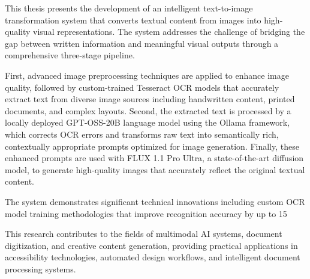 
This thesis presents the development of an intelligent text-to-image transformation system that converts textual content from images into high-quality visual representations. The system addresses the challenge of bridging the gap between written information and meaningful visual outputs through a comprehensive three-stage pipeline.

First, advanced image preprocessing techniques are applied to enhance image quality, followed by custom-trained Tesseract OCR models that accurately extract text from diverse image sources including handwritten content, printed documents, and complex layouts. Second, the extracted text is processed by a locally deployed GPT-OSS-20B language model using the Ollama framework, which corrects OCR errors and transforms raw text into semantically rich, contextually appropriate prompts optimized for image generation. Finally, these enhanced prompts are used with FLUX 1.1 Pro Ultra, a state-of-the-art diffusion model, to generate high-quality images that accurately reflect the original textual content.

The system demonstrates significant technical innovations including custom OCR model training methodologies that improve recognition accuracy by up to 15%

This research contributes to the fields of multimodal AI systems, document digitization, and creative content generation, providing practical applications in accessibility technologies, automated design workflows, and intelligent document processing systems.